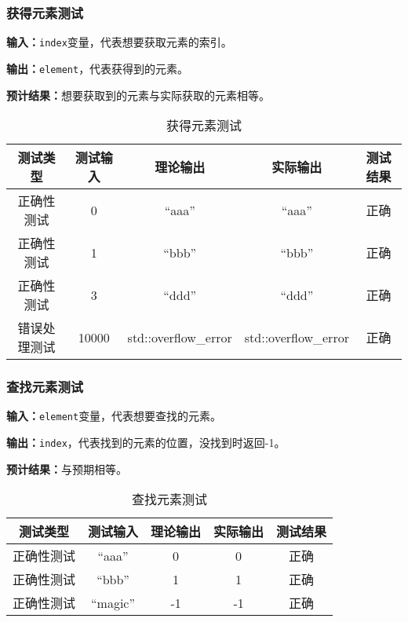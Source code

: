 \subsubsection{获得元素测试}
\textbf{输入：}\texttt{index}变量，代表想要获取元素的索引。
\par
\textbf{输出：}\texttt{element}，代表获得到的元素。
\par
\textbf{预计结果：}想要获取到的元素与实际获取的元素相等。
\begin{table}[h]
    \centering
    \caption{获得元素测试}
    \begin{tabular}{@{}ccccc@{}}
        \toprule
        \multicolumn{1}{c}{测试类型}    & \multicolumn{1}{c}{测试输入} & \multicolumn{1}{c}{理论输出} & \multicolumn{1}{c}{实际输出} &
        \multicolumn{1}{c}{测试结果} \\ \midrule
        \multicolumn{1}{c|}{正确性测试}  & 0&``aaa''&``aaa''&正确\\
        \multicolumn{1}{c|}{正确性测试}  & 1&``bbb''&``bbb''&正确\\
        \multicolumn{1}{c|}{正确性测试}  & 3&``ddd''&``ddd''&正确\\
        \multicolumn{1}{c|}{错误处理测试} & 10000& std::overflow\_error& std::overflow\_error& 正确\\ \bottomrule
    \end{tabular}
    \label{tab:gettest2}
\end{table}

\subsubsection{查找元素测试}
\textbf{输入：}\texttt{element}变量，代表想要查找的元素。
\par
\textbf{输出：}\texttt{index}，代表找到的元素的位置，没找到时返回-1。
\par
\textbf{预计结果：}与预期相等。
\begin{table}[h]
    \centering
    \caption{查找元素测试}
    \begin{tabular}{@{}ccccc@{}}
        \toprule
        \multicolumn{1}{c}{测试类型}    & \multicolumn{1}{c}{测试输入} & \multicolumn{1}{c}{理论输出} & \multicolumn{1}{c}{实际输出} &
        \multicolumn{1}{c}{测试结果} \\ \midrule
        \multicolumn{1}{c|}{正确性测试}  & ``aaa''&0&0&正确\\
        \multicolumn{1}{c|}{正确性测试}  & ``bbb''&1&1&正确\\
        \multicolumn{1}{c|}{正确性测试}  & ``magic''&-1&-1&正确\\ \bottomrule
    \end{tabular}
    \label{tab:locatetest2}
\end{table}


